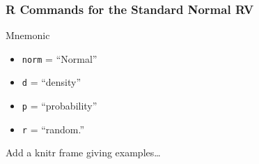 \begin{frame}
  \frametitle{R Commands for the Standard Normal RV}

\begin{table}
\centering
{}
\end{table}

\begin{block}{Mnemonic}
  \begin{itemize}
    \item \texttt{norm} = ``Normal'' 
    \item \texttt{d} = ``density''
    \item \texttt{p} = ``probability'' 
    \item \texttt{r} = ``random.''
  \end{itemize}
\end{block}

\end{frame}
\begin{frame}
Add a knitr frame giving examples\dots
\end{frame}

